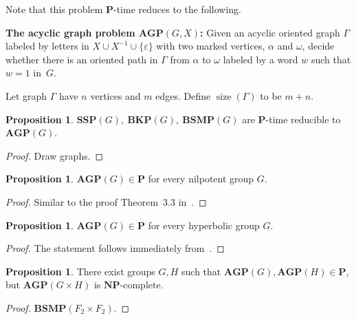 \documentclass[10pt]{amsart}
\theoremstyle{definition}
\newtheorem{proposition}[theorem]{Proposition}
\DeclareMathOperator{\size}{{size}}
\def\P{{\mathbf{P}}}
\def\NP{{\mathbf{NP}}}
\def\SSP{{\mathbf{SSP}}}
\def\BSMP{{\mathbf{BSMP}}}
\def\BKP{{\mathbf{BKP}}}
\def\AGP{{\mathbf{AGP}}}
\begin{document}
\medskip
Note that this problem $\P$-time reduces to the following.

\medskip
\noindent
{\bf The acyclic graph problem $\AGP(G,X)$\index{$\AGP(G,X)$}:}
Given an acyclic oriented graph $\Gamma$ labeled by letters in $X\cup X^{-1}\cup \{\varepsilon\}$ with two marked vertices, $\alpha$ and $\omega$, decide whether there is an oriented path in $\Gamma$ from $\alpha$ to $\omega$ labeled by a word $w$ such that $w=1$ in~$G$.

\medskip
Let graph $\Gamma$ have $n$ vertices and $m$ edges. Define $\size(\Gamma)$ to be $m+n$.  
\begin{proposition}
$\SSP(G),\ \BKP(G),\ \BSMP(G)$ are $\P$-time reducible to $\AGP(G)$.
\end{proposition}
\begin{proof} Draw graphs.
\end{proof}

\begin{proposition}
$\AGP(G)\in\P$ for every nilpotent group $G$.
\end{proposition}
\begin{proof}
Similar to the proof Theorem~3.3 in~\cite{MNU1}.
\end{proof}

\begin{proposition}
$\AGP(G)\in\P$ for every hyperbolic group $G$.
\end{proposition}
\begin{proof}
The statement follows immediately from~\cite[Proposition 5.5]{MNU1}.
\end{proof}


\begin{proposition}
There exist groups $G,H$ such that $\AGP(G),\AGP(H)\in\P$, but $\AGP(G\times H)$ is $\NP$-complete.
\end{proposition}
\begin{proof}
$\BSMP(F_2\times F_2)$.
\end{proof}
\end{document}

